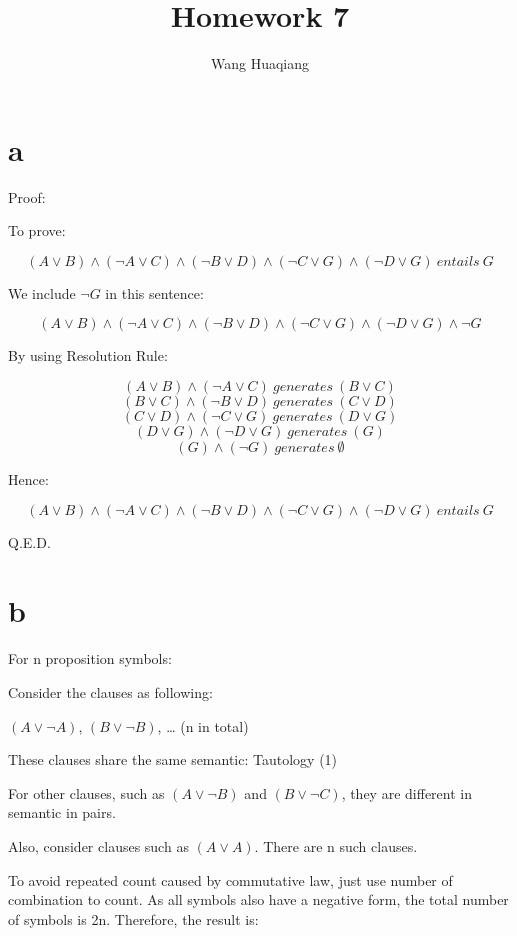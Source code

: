 \documentclass{article} %
\title{Homework 7}
\author{Wang Huaqiang}
\begin{document}
	
	\maketitle
	
	
	
	\hypertarget{a}{%
		\section{a}\label{a}}
	
	Proof:
	
	To prove:
	
	\[(A \vee B ) \wedge (\neg A \vee C) \wedge (\neg B \vee D) \wedge (\neg C \vee G ) \wedge (\neg D \vee G) \ entails \  G\]
	
	We include \(\neg G\) in this sentence:
	
	\[(A \vee B ) \wedge (\neg A \vee C) \wedge (\neg B \vee D) \wedge (\neg C \vee G ) \wedge (\neg D \vee G) \wedge \neg G\]
	
	By using Resolution Rule:
	
	\[(A \vee B ) \wedge (\neg A \vee C) \ generates \ (B \vee C) \]
	\[(B \vee C) \wedge (\neg B \vee D) \ generates \ (C \vee D) \]
	\[(C \vee D) \wedge (\neg C \vee G) \ generates \ (D \vee G) \]
	\[(D \vee G) \wedge (\neg D \vee G) \ generates \ (G) \]
	\[(G) \wedge (\neg G) \ generates \ \emptyset  \]
	
	Hence:
	
	\[(A \vee B ) \wedge (\neg A \vee C) \wedge (\neg B \vee D) \wedge (\neg C \vee G ) \wedge (\neg D \vee G) \ entails \  G\]
	
	Q.E.D.
	
	\hypertarget{b}{%
		\section{b}\label{b}}
	
	For n proposition symbols:
	
	Consider the clauses as following:
	
	\((A \vee \neg A)\), \((B \vee \neg B)\), \ldots{} (n in total)
	
	These clauses share the same semantic: Tautology (1)
	
	For other clauses, such as \((A \vee \neg B)\) and \((B \vee \neg C)\),
	they are different in semantic in pairs.
	
	Also, consider clauses such as \((A \vee A)\). There are n such clauses.
	
	To avoid repeated count caused by commutative law, just use number of
	combination to count. As all symbols also have a negative form, the
	total number of symbols is 2n. Therefore, the result is:
	
\end{document}
